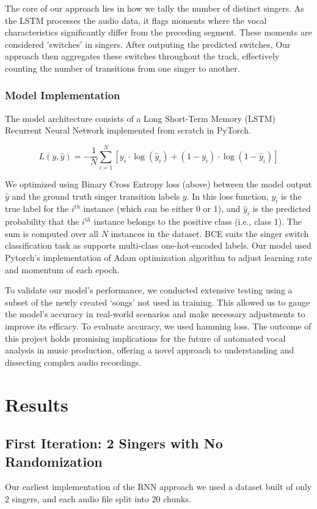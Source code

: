 \documentclass[conference]{IEEEtran}
\begin{document}
The core of our approach lies in how we tally the number of distinct singers. As the LSTM processes the audio data, it flags moments where the vocal characteristics significantly differ from the preceding segment. These moments are considered 'switches' in singers. After outputing the predicted switches, Our approach then aggregates these switches throughout the track, effectively counting the number of transitions from one singer to another.

\subsubsection{Model Implementation}
The model architecture consists of a Long Short-Term Memory (LSTM) Recurrent Neural Network implemented from scratch in PyTorch. 

$$L(y, \hat{y}) = -\frac{1}{N} \sum_{i=1}^{N} [y_i \cdot \log(\hat{y}_i) + (1 - y_i) \cdot \log(1 - \hat{y}_i)]$$

We optimized using Binary Cross Entropy loss (above) between the model output $ \hat{y}$ and the ground truth singer transition labels $y$. In this loss function, $y_i$ is the true label for the $i^{th}$ instance (which can be either 0 or 1), and $\hat{y}_i$ is the predicted probability that the $i^{th}$ instance belongs to the positive class (i.e., class 1). The sum is computed over all $N$ instances in the dataset. BCE suits the singer switch classification task as supports multi-class one-hot-encoded labels. Our model used Pytorch's implementation of Adam optimization algorithm to adjust learning rate and momentum of each epoch.

To validate our model's performance, we conducted extensive testing using a subset of the newly created `songs' not used in training. This allowed us to gauge the model's accuracy in real-world scenarios and make necessary adjustments to improve its efficacy. To evaluate accuracy, we used hamming loss. The outcome of this project holds promising implications for the future of automated vocal analysis in music production, offering a novel approach to understanding and dissecting complex audio recordings.

\section{Results}


\subsection{First Iteration: 2 Singers with No Randomization}
    Our earliest implementation of the RNN approach we used a dataset built of only $2$ singers, and each audio file split into $20$ chunks. 
    
\end{document}
